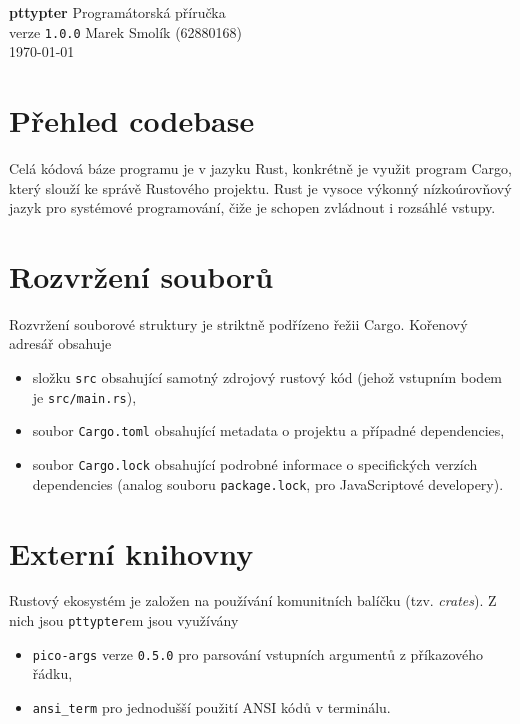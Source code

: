 \documentclass[11pt, letterpaper]{article}
\begin{document}
 
\begin{center}
\vfill
{\Huge \textbf{pttypter}}
\vfill
{\huge Programátorská příručka} \\
{\large verze \texttt{1.0.0}}
\vfill
{\Large Marek Smolík (62880168)} \\
\today
\vfill
\end{center}

\section{Přehled codebase}

Celá kódová báze programu je v jazyku Rust, konkrétně je využit program Cargo, který slouží ke správě Rustového projektu. Rust je vysoce výkonný nízkoúrovňový jazyk pro systémové programování, čiže je schopen zvládnout i rozsáhlé vstupy.

\section{Rozvržení souborů}
Rozvržení souborové struktury je striktně podřízeno řežii Cargo. Kořenový adresář obsahuje

\begin{itemize}
    \item složku \texttt{src} obsahující samotný zdrojový rustový kód (jehož vstupním bodem je \texttt{src/main.rs}),~
    \item soubor \texttt{Cargo.toml} obsahující metadata o projektu a případné dependencies,
    \item soubor \texttt{Cargo.lock} obsahující podrobné informace o specifických verzích dependencies (analog souboru \texttt{package.lock}, pro JavaScriptové developery).
\end{itemize}

\section{Externí knihovny}
Rustový ekosystém je založen na používání komunitních balíčku (tzv. \textit{crates}). Z nich jsou  \texttt{pttypter}em jsou využívány
\begin{itemize}
    \item \texttt{pico-args} verze \texttt{0.5.0} pro parsování vstupních argumentů z příkazového řádku,
    \item \texttt{ansi\_term} pro jednodušší použití ANSI kódů v terminálu.
\end{itemize}
\end{document}
